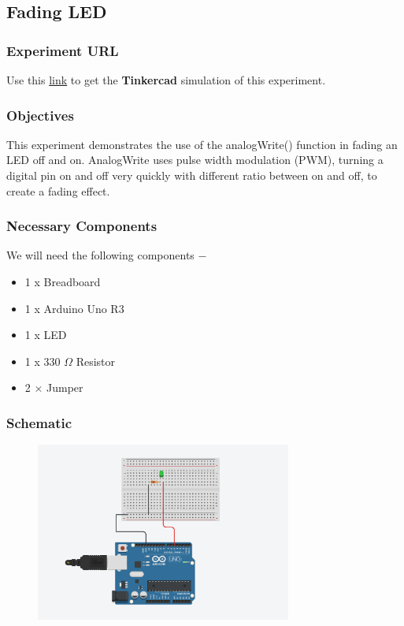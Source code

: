 
\pagebreak\subsection{Fading LED}

\subsubsection{Experiment URL}
Use this \href{https://www.tinkercad.com/things/dPLO4csum3h?sharecode=fTlXe0aOvAKUaa1xymJ71oC1m0_NHLRisRVjCh7YtyI}{link} to get the \textbf{Tinkercad} simulation of this experiment.
        
\subsubsection{Objectives}
This experiment demonstrates the use of the analogWrite() function in fading an LED off and on. AnalogWrite uses pulse width modulation (PWM), turning a digital pin on and off very quickly with different ratio between on and off, to create a fading effect.
\subsubsection{Necessary Components}
We will need the following components −
\begin{itemize}
    \item 1 x Breadboard
    \item 1 x Arduino Uno R3
    \item 1 x LED
    \item 1 x 330 $\Omega$ Resistor
    \item 2 × Jumper
\end{itemize}
\subsubsection{Schematic}
        \begin{figure}[!ht]
            \centering
            \includegraphics[width =0.75\textwidth]{images/FadingLED.png}
        \end{figure}
            
